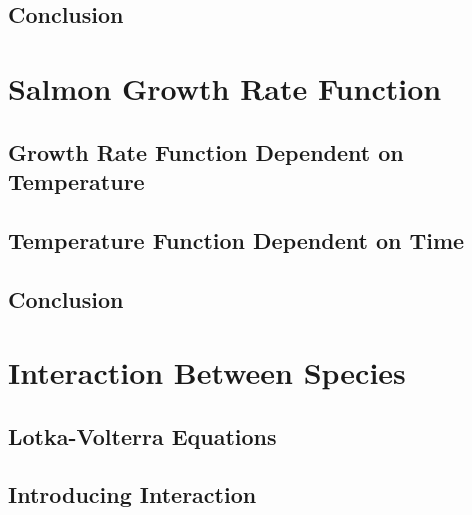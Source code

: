 \documentclass{CPP}
\begin{document}


\section{Conclusion}



\chapter{Salmon Growth Rate Function}



\section{Growth Rate Function Dependent on Temperature}



\section{Temperature Function Dependent on Time}



\section{Conclusion}



\chapter{Interaction Between Species}



\section{Lotka-Volterra Equations}



\section{Introducing Interaction}


\end{document}
